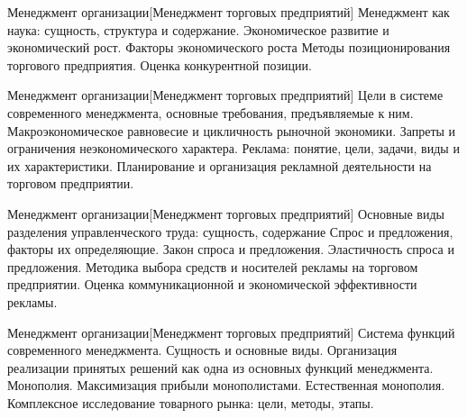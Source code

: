 \documentclass[
	11pt,
	a4paper,
	]
	{article}
\begin{document}
\vfill



\begin{minipage}[t][\miniH]{\miniL}\centering
	 {Менеджмент организации}[Менеджмент торговых предприятий]
		{
			Менеджмент как наука: сущность, структура и содержание.
		}{
			Экономическое развитие и экономический рост. Факторы экономического роста
		}{
			Методы позиционирования торгового предприятия. Оценка конкурентной позиции.
		}
	\lowGE
\end{minipage}

\vfill



\begin{minipage}[t][\miniH]{\miniL}\centering
	 {Менеджмент организации}[Менеджмент торговых предприятий]
		{
			Цели в системе современного менеджмента, основные требования, предъявляемые к ним.
		}{
			Макроэкономическое равновесие и цикличность рыночной экономики. Запреты и ограничения неэкономического характера.
		}{
			Реклама: понятие, цели, задачи, виды и их характеристики. Планирование и организация рекламной деятельности на торговом предприятии.
		}
	\lowGE
\end{minipage}





\begin{minipage}[t][\miniH]{\miniL}\centering
	 {Менеджмент организации}[Менеджмент торговых предприятий]
		{
			Основные виды разделения управленческого труда: сущность, содержание
		}{
			Спрос и предложения, факторы их определяющие. Закон спроса и предложения. Эластичность спроса и предложения.
		}{
			Методика выбора средств и носителей рекламы на торговом предприятии. Оценка коммуникационной и экономической эффективности рекламы.
		}
	\lowGE
\end{minipage}

\vfill



\begin{minipage}[t][\miniH]{\miniL}\centering
	 {Менеджмент организации}[Менеджмент торговых предприятий]
		{
			Система функций современного менеджмента. Сущность и основные виды. Организация реализации принятых решений как одна из основных функций менеджмента.
		}{
			Монополия. Максимизация прибыли монополистами. Естественная монополия.
		}{
			Комплексное исследование товарного рынка: цели, методы, этапы.
		}
	\lowGE
\end{minipage}
\end{document}
